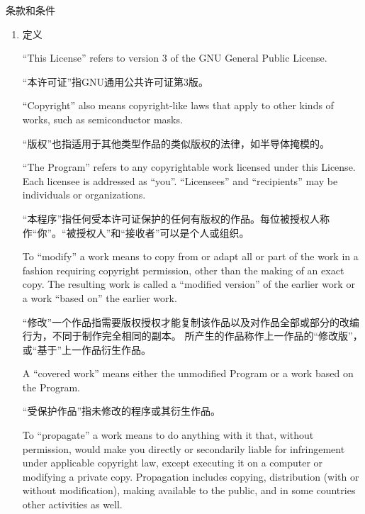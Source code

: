 \documentclass[11pt]{article}
\begin{document}
\begin{center}
  {\Large 条款和条件}
\end{center}


\begin{enumerate}

  \addtocounter{enumi}{-1}

  \item 定义

        ``This License'' refers to version 3 of the GNU General Public License.

        “本许可证”指GNU通用公共许可证第3版。

        ``Copyright'' also means copyright-like laws that apply to other kinds of
        works, such as semiconductor masks.

        “版权”也指适用于其他类型作品的类似版权的法律，如半导体掩模的。

        ``The Program'' refers to any copyrightable work licensed under this
        License.  Each licensee is addressed as ``you''.  ``Licensees'' and
        ``recipients'' may be individuals or organizations.

        “本程序”指任何受本许可证保护的任何有版权的作品。每位被授权人称作“你”。“被授权人”和“接收者”可以是个人或组织。

        To ``modify'' a work means to copy from or adapt all or part of the work
        in a fashion requiring copyright permission, other than the making of an
        exact copy.  The resulting work is called a ``modified version'' of the
        earlier work or a work ``based on'' the earlier work.

        “修改”一个作品指需要版权授权才能复制该作品以及对作品全部或部分的改编行为，不同于制作完全相同的副本。
        所产生的作品称作上一作品的“修改版”，或“基于”上一作品衍生作品。

        A ``covered work'' means either the unmodified Program or a work based
        on the Program.

        “受保护作品”指未修改的程序或其衍生作品。

        To ``propagate'' a work means to do anything with it that, without
        permission, would make you directly or secondarily liable for
        infringement under applicable copyright law, except executing it on a
        computer or modifying a private copy.  Propagation includes copying,
        distribution (with or without modification), making available to the
        public, and in some countries other activities as well.


\end{enumerate}
\end{document}
